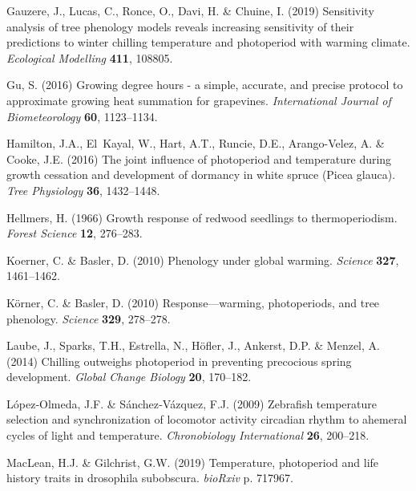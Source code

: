 \documentclass[11pt]{article}
\begin{document}
\begin{thebibliography}{49}
Gauzere, J., Lucas, C., Ronce, O., Davi, H. \& Chuine, I. (2019) Sensitivity
  analysis of tree phenology models reveals increasing sensitivity of their
  predictions to winter chilling temperature and photoperiod with warming
  climate. \emph{Ecological Modelling} \textbf{411}, 108805.

Gu, S. (2016) Growing degree hours - a simple, accurate, and precise protocol
  to approximate growing heat summation for grapevines. \emph{International
  Journal of Biometeorology} \textbf{60}, 1123--1134.

Hamilton, J.A., El~Kayal, W., Hart, A.T., Runcie, D.E., Arango-Velez, A. \&
  Cooke, J.E. (2016) {The joint influence of photoperiod and temperature during
  growth cessation and development of dormancy in white spruce (Picea glauca)}.
  \emph{Tree Physiology} \textbf{36}, 1432--1448.

Hellmers, H. (1966) Growth response of redwood seedlings to thermoperiodism.
  \emph{Forest Science} \textbf{12}, 276--283.

Koerner, C. \& Basler, D. (2010) Phenology under global warming. \emph{Science}
  \textbf{327}, 1461--1462.

K{\"o}rner, C. \& Basler, D. (2010) Response---warming, photoperiods, and tree
  phenology. \emph{Science} \textbf{329}, 278--278.

Laube, J., Sparks, T.H., Estrella, N., H{\"o}fler, J., Ankerst, D.P. \& Menzel,
  A. (2014) Chilling outweighs photoperiod in preventing precocious spring
  development. \emph{Global Change Biology} \textbf{20}, 170--182.

L{\'o}pez‐Olmeda, J.F. \& S{\'a}nchez‐V{\'a}zquez, F.J. (2009) Zebrafish
  temperature selection and synchronization of locomotor activity circadian
  rhythm to ahemeral cycles of light and temperature. \emph{Chronobiology
  International} \textbf{26}, 200--218.

MacLean, H.J. \& Gilchrist, G.W. (2019) Temperature, photoperiod and life
  history traits in drosophila subobscura. \emph{bioRxiv} p. 717967.


\end{thebibliography}
\end{document}
